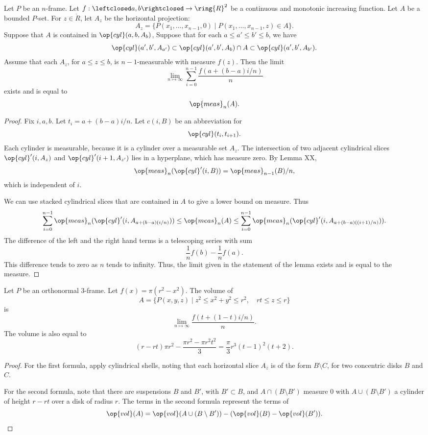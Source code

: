 \begin{lemma}  Let $P$ be an $n$-frame.
Let $f:\leftclosed a,b \rightclosed\to \ring{R}^2$ be a continuous
and monotonic increasing function.  Let $A$ be a bounded $P$-set.
For $z\in\ring{R}$, let $A_z$ be the horizontal projection:
    $$A_z = \{P(x_1,\ldots,x_{n-1},0)\mid P(x_1,\ldots,x_{n-1},z)\in A\}.$$
Suppose that $A$ is contained in $\op{cyl}(a,b,A_{b})$,  Suppose
that for each $a\le a'\le b'\le b$, we have
    $$\op{cyl}(a',b',A_{a'})\subset \op{cyl}(a',b',A_{b})\cap A
    \subset \op{cyl}(a',b',A_{b'}).$$
Assume that each $A_z$, for $a\le z\le b$, is $n-1$-measurable with
measure $f(z)$.  Then the limit
    $$\lim_{n\mapsto\infty}
    \sum_{i=0}^{n-1}\frac{f(a+(b-a)i/n)}{n}$$
exists and is equal to
    $$\op{meas}_n(A).$$
\end{lemma}

\begin{proof}
Fix $i,a,b$.  Let $t_i = a + (b-a)i/n$.  Let $c(i,B)$ be an
abbreviation for
    $$
    \op{cyl}(t_i,t_{i+1}).
    $$
Each cylinder is measurable, because it is a cylinder over a
measurable set $A_z$. The intersection of two adjacent cylindrical
slices $\op{cyl}'(i,A_z)$ and $\op{cyl}'(i+1,A_{z'})$ lies in a
hyperplane, which has measure zero. By Lemma XX,
    $$\op{meas}_n(\op{cyl}'(i,B)) = \op{meas}_{n-1}(B)/n,$$
which is independent of $i$.

We can use stacked cylindrical slices that are contained in $A$ to
give a lower bound on measure.  Thus
$$\sum_{i=0}^{n-1}\op{meas}_n(\op{cyl}'(i,A_{a+(b-a)(i/n)})) \le
\op{meas}_n(A)\le
\sum_{i=0}^{n-1}\op{meas}_n(\op{cyl}'(i,A_{a+(b-a)((i+1)/n)})).$$
The difference of the left and the right hand terms is a telescoping
series with sum
    $$\frac{1}{n} f(b) -
    \frac{1}{n}f(a) .$$
This difference tends to zero as $n$ tends to infinity. Thus, the
limit given in the statement of the lemma exists and is equal to the
measure.
\end{proof}

\begin{lemma} Let $P$ be an orthonormal $3$-frame.
Let $f(x) = \pi(r^2-x^2)$.  The volume of
    $$A=\{P(x,y,z) \mid z^2\le x^2 + y^2\le r^2,\quad r t\le z\le r\}$$
is $$\lim_{n\mapsto\infty} \frac{f(t + (1-t)i/n)}n.$$ The volume is
also equal to
    $$
    (r-r t)\pi r^2 - \frac{\pi r^2 - \pi r^2 t^2}3 =
    \frac{\pi}3 r^3 (t-1)^2 (t+2).
    $$
\end{lemma}

\begin{proof} For the first formula, apply cylindrical shells,
noting that each horizontal slice $A_z$ is of the form $B\setminus
C$, for two concentric disks $B$ and $C$.

For the second formula, note that there are suspensions $B$ and
$B'$, with $B'\subset B$, and $A\cap (B\setminus B')$ measure $0$
with $A\cup (B\setminus B')$ a cylinder of height $r-r t$ over a
disk of radius $r$.  The terms in the second formula represent the
terms of
    $$\op{vol}(A) = \op{vol}(A\cup (B\setminus B')) - (\op{vol}(B)-\op{vol}(B')).$$
\end{proof}

